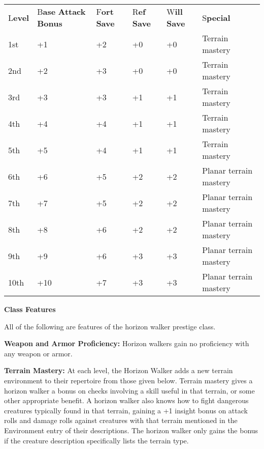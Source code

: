 \documentclass{article}
\begin{document}
\vspace{12pt}
\parindent=0pt
\begin{tabular}{|>{\raggedright}p{26pt}|>{\raggedright}p{33pt}|>{\raggedright}p{23pt}|>{\raggedright}p{23pt}|>{\raggedright}p{23pt}|>{\raggedright}p{91pt}|}
\hline
\multicolumn{6}{|p{221pt}|}{T\textbf{able: The Horizon Walker}}\tabularnewline
\hline
L\textbf{evel} & B\textbf{ase}\linebreak{}
\textbf{Attack}\linebreak{}
\textbf{Bonus} & F\textbf{ort}\linebreak{}
\textbf{Save} & R\textbf{ef}\linebreak{}
\textbf{Save} & W\textbf{ill}\linebreak{}
\textbf{Save} & S\textbf{pecial}\tabularnewline
\hline
1st & +1 & +2 & +0 & +0 & Terrain mastery\tabularnewline
\hline
2nd & +2 & +3 & +0 & +0 & Terrain mastery\tabularnewline
\hline
3rd & +3 & +3 & +1 & +1 & Terrain mastery\tabularnewline
\hline
4th & +4 & +4 & +1 & +1 & Terrain mastery\tabularnewline
\hline
5th & +5 & +4 & +1 & +1 & Terrain mastery\tabularnewline
\hline
6th & +6 & +5 & +2 & +2 & Planar terrain mastery\tabularnewline
\hline
7th & +7 & +5 & +2 & +2 & Planar terrain mastery\tabularnewline
\hline
8th & +8 & +6 & +2 & +2 & Planar terrain mastery\tabularnewline
\hline
9th & +9 & +6 & +3 & +3 & Planar terrain mastery\tabularnewline
\hline
10th & +10 & +7 & +3 & +3 & Planar terrain mastery\tabularnewline
\hline
\end{tabular}

\vspace{12pt}
\textbf{Class Features}

All of the following are features of the horizon walker prestige class.

\textbf{Weapon and Armor Proficiency:} Horizon walkers gain no proficiency with 
any weapon or armor.

\textbf{Terrain Mastery:} At each level, the Horizon Walker adds a new terrain 
environment to their repertoire from those given below. Terrain mastery gives a 
horizon walker a bonus on checks involving a skill useful in that terrain, or some 
other appropriate benefit. A horizon walker also knows how to fight dangerous creatures 
typically found in that terrain, gaining a +1 insight bonus on attack rolls and 
damage rolls against creatures with that terrain mentioned in the Environment entry 
of their descriptions. The horizon walker only gains the bonus if the creature 
description specifically lists the terrain type.
\end{document}
